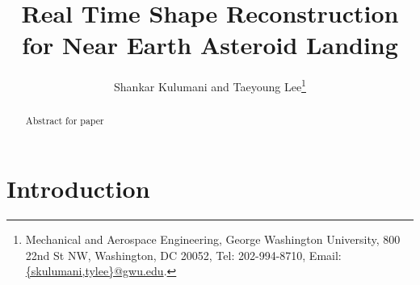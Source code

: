 \documentclass[letterpaper, paper,11pt]{AAS}		%
\begin{document}
\title{Real Time Shape Reconstruction for Near Earth Asteroid Landing}

\author{Shankar Kulumani and Taeyoung Lee\thanks{Mechanical and Aerospace Engineering, George Washington University, 800 22nd St NW, Washington, DC 20052, Tel: 202-994-8710, Email: \href{mailto:skulumani@gwu.edu}{\{skulumani,tylee\}@gwu.edu}.}
}


\maketitle{} 		

\begin{abstract}
    Abstract for paper
\end{abstract}

\section{Introduction}\label{sec:introduction}
\end{document}
